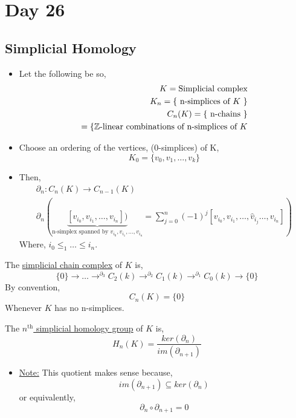 \documentclass[../notes.tex]{subfiles}
\begin{document}
\section{Day 26}
\subsection{Simplicial Homology}
\begin{itemize}
    \item Let the following be so,
        \begin{align*}
            K=\text{Simplicial complex}\\
            K_n=\{\text{ n-simplices of $K$ }\}\\
            C_n(K)=\{\text{ n-chains }\}\\
            =\{\text{$\mathbb{Z}$-linear combinations of n-simplices of $K$}\\
        \end{align*}
    \item Choose an ordering of the vertices, (0-simplices) of K,
        \[
            K_0=\{v_0,v_1,\dots,v_k\}
        \]
    \item Then,
        \begin{align*}
            \partial_n:C_n(K)\rightarrow C_{n-1}(K)\\
            \partial_n(\underbrace{[v_{i_0},v_{i_1},\dots,v_{i_n}])}_{\text{
                    n-simplex spanned by $v_{i_0},v_{i_1},\dots,v_{i_n}$}}
                =
            \sum_{j=0}^n(-1)^j[v_{i_0},v_{i_1},\dots,\hat{v}_{i_j}\dots,v_{i_n}])
        \end{align*}
        Where, $i_0\le_1\dots\le i_n$.
\end{itemize}
\begin{definition}
    The \underline{simplicial chain complex} of $K$ is,
    \[
        \{0\}\rightarrow\dots \rightarrow^{\partial_3}C_2(k)
        \rightarrow^{\partial_2}C_1(k)
        \rightarrow^{\partial_1}C_0(k)
        \rightarrow \{0\}
    \]
    By convention,
    \[
        C_n(K)=\{0\}
    \]
    Whenever $K$ has no n-simplices.
\end{definition}
\begin{definition}
    The \underline{$n^{\text{th}}$ simplicial homology group} of $K$ is,
    \[
        H_n(K)=\frac{ker(\partial_n)}{im(\partial_{n+1})}
    \]
\end{definition}
\begin{itemize}
    \item \underline{Note:} This quotient makes sense because,
        \[
            im(\partial_{n+1})\subseteq ker(\partial_n)
        \]
        or equivalently,
        \[
            \partial_n \circ \partial_{n+1}=0
        \]
\end{itemize}
\end{document}
